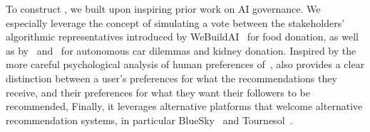 To construct \Veche{}, we built upon inspiring prior work on AI governance.
We especially leverage the concept of simulating a vote 
between the stakeholders' algorithmic representatives introduced by
WeBuildAI~\cite{DBLP:journals/pacmhci/LeeKKKYCSNLPP19} for food donation,
as well as by~\cite{DBLP:conf/aaai/NoothigattuGADR18} and~\cite{DBLP:journals/ai/FreedmanBSDC20}
for autonomous car dilemmas and kidney donation.
Inspired by the more careful psychological analysis 
of human preferences of~\cite{DBLP:conf/aaai/Hoang19,DBLP:conf/hci/LechiakhM23},
\Veche{} also provides a clear distinction 
between a user's preferences for what the recommendations they receive,
and their preferences for what they want their followers to be recommended,
Finally, it leverages alternative platforms that welcome alternative recommendation systems,
in particular BlueSky~\cite{kleppmann2024bluesky} and Tournesol~\cite{hoang2025tournesol}.
